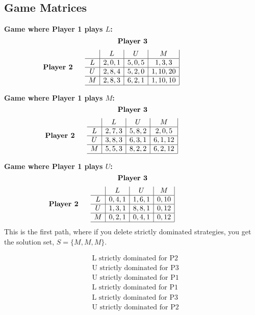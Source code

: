 \documentclass{article}
\begin{document}
\subsection*{Game Matrices}

\textbf{Game where Player 1 plays $L$:}
\[
\text{\textbf{Player 3}}
\]
\[
\makebox[0pt][r]{\text{\textbf{Player 2 }} \quad}
\begin{array}{c|c|c|c|}
 & L & U & M \\
 \hline
L & 2,0,1 & 5,0,5 & 1,3,3 \\
\hline
U & 2,8,4 & 5,2,0 & 1,10,20 \\
\hline
M & 2,8,3 & 6,2,1 & 1,10,10 \\
\hline
\end{array}
\]

\noindent \textbf{Game where Player 1 plays $M$:}
\[
\text{\textbf{Player 3}}
\]
\[
\makebox[0pt][r]{\text{\textbf{Player 2 }} \quad}
\begin{array}{c|c|c|c|}
 & L & U & M \\
 \hline
L & 2,7,3 & 5,8,2 & 2,0,5 \\
\hline
U & 3,8,3 & 6,3,1 & 6,1,12 \\
\hline
M & 5,5,3 & 8,2,2 & 6,2,12 \\
\hline
\end{array}
\]

\noindent \textbf{Game where Player 1 plays $U$:}
\[
\text{\textbf{Player 3}}
\]
\[
\makebox[0pt][r]{\text{\textbf{Player 2 }} \quad}
\begin{array}{c|c|c|c|}
& L & U & M \\
\hline
L & 0,4,1 & 1,6,1 & 0,10 \\
\hline
U & 1,3,1 & 8,8,1 & 0,12 \\
\hline
M & 0,2,1 & 0,4,1 & 0,12 \\
\hline
\end{array}
\]
This is the first path, where if you delete strictly dominated strategies, you get the solution set, $S = \{M, M, M\}$. 

\begin{align*}
& \text{L strictly dominated for P2} \\
& \text{U strictly dominated for P3} \\
& \text{U strictly dominated for P1} \\
& \text{L strictly dominated for P1} \\
& \text{L strictly dominated for P3} \\
& \text{U strictly dominated for P2} \\
\end{align*}
\end{document}
